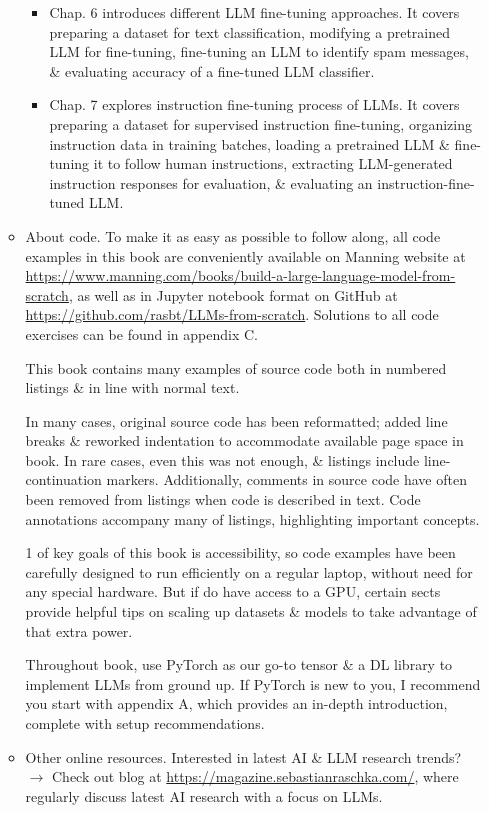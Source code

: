 \documentclass{article}
\begin{document}
\begin{itemize}
\begin{itemize}
\begin{itemize}
			\item Chap. 6 introduces different LLM fine-tuning approaches. It covers preparing a dataset for text classification, modifying a pretrained LLM for fine-tuning, fine-tuning an LLM to identify spam messages, \& evaluating accuracy of a fine-tuned LLM classifier.
			\item Chap. 7 explores instruction fine-tuning process of LLMs. It covers preparing a dataset for supervised instruction fine-tuning, organizing instruction data in training batches, loading a pretrained LLM \& fine-tuning it to follow human instructions, extracting LLM-generated instruction responses for evaluation, \& evaluating an instruction-fine-tuned LLM.
		\end{itemize}
		\item {\sf About code.} To make it as easy as possible to follow along, all code examples in this book are conveniently available on Manning website at \url{https://www.manning.com/books/build-a-large-language-model-from-scratch}, as well as in Jupyter notebook format on GitHub at \url{https://github.com/rasbt/LLMs-from-scratch}. Solutions to all code exercises can be found in appendix C.
		
		This book contains many examples of source code both in numbered listings \& in line with normal text.
		
		In many cases, original source code has been reformatted; added line breaks \& reworked indentation to accommodate available page space in book. In rare cases, even this was not enough, \& listings include line-continuation markers. Additionally, comments in source code have often been removed from listings when code is described in text. Code annotations accompany many of listings, highlighting important concepts.
		
		1 of key goals of this book is accessibility, so code examples have been carefully designed to run efficiently on a regular laptop, without need for any special hardware. But if do have access to a GPU, certain sects provide helpful tips on scaling up datasets \& models to take advantage of that extra power.
		
		Throughout book, use PyTorch as our go-to tensor \& a DL library to implement LLMs from ground up. If PyTorch is new to you, I recommend you start with appendix A, which provides an in-depth introduction, complete with setup recommendations.
		\item {\sf Other online resources.} Interested in latest AI \& LLM research trends? $\to$ Check out blog at \url{https://magazine.sebastianraschka.com/}, where regularly discuss latest AI research with a focus on LLMs.
		

\end{itemize}
\end{itemize}
\end{document}
